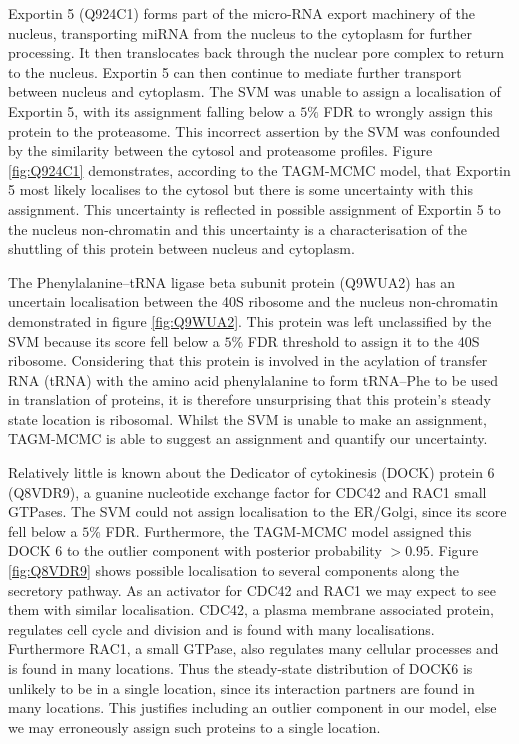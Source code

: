 \documentclass[12pt,english]{article}\usepackage[]{graphicx}\usepackage[]{color}
\begin{document}
\bigskip

Exportin 5 (Q924C1) forms part of the micro-RNA export machinery of
the nucleus, transporting miRNA from the nucleus to the cytoplasm for
further processing.  It then translocates back through the nuclear
pore complex to return to the nucleus.  Exportin 5 can then continue
to mediate further transport between nucleus and cytoplasm.  The SVM
was unable to assign a localisation of Exportin 5, with its assignment
falling below a $5\%$ FDR to wrongly assign this protein to the
proteasome. This incorrect assertion by the SVM was confounded by the
similarity between the cytosol and proteasome profiles.  Figure
\ref{fig:Q924C1} demonstrates, according to the TAGM-MCMC model, that
Exportin 5 most likely localises to the cytosol but there is some
uncertainty with this assignment.  This uncertainty is reflected in
possible assignment of Exportin 5 to the nucleus non-chromatin and
this uncertainty is a characterisation of the shuttling of this
protein between nucleus and cytoplasm.

The Phenylalanine--tRNA ligase beta subunit protein (Q9WUA2) has an
uncertain localisation between the 40S ribosome and the nucleus
non-chromatin demonstrated in figure \ref{fig:Q9WUA2}. This protein
was left unclassified by the SVM because its score fell below a $5\%$
FDR threshold to assign it to the 40S ribosome. Considering that this
protein is involved in the acylation of transfer RNA (tRNA) with the
amino acid phenylalanine to form tRNA--Phe to be used in translation of
proteins, it is therefore unsurprising that this protein's steady
state location is ribosomal.  Whilst the SVM is unable to make an
assignment, TAGM-MCMC is able to suggest an assignment and quantify our
uncertainty.

Relatively little is known about the Dedicator of cytokinesis (DOCK)
protein 6 (Q8VDR9), a guanine nucleotide exchange factor for CDC42 and
RAC1 small GTPases. The SVM could not assign localisation to the
ER/Golgi, since its score fell below a $5\%$ FDR. Furthermore, the
TAGM-MCMC model assigned this DOCK 6 to the outlier component with
posterior probability $>0.95$.  Figure \ref{fig:Q8VDR9} shows possible
localisation to several components along the secretory pathway. As an
activator for CDC42 and RAC1 we may expect to see them with similar
localisation. CDC42, a plasma membrane associated protein, regulates
cell cycle and division and is found with many
localisations. Furthermore RAC1, a small GTPase, also regulates many
cellular processes and is found in many locations. Thus the
steady-state distribution of DOCK6 is unlikely to be in a single
location, since its interaction partners are found in many
locations. This justifies including an outlier component in our model,
else we may erroneously assign such proteins to a single location.
\end{document}
